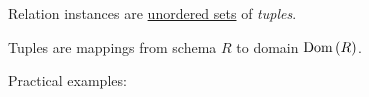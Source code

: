 \begin{multicols}{2}
\begin{CheatsheetEntryFrame}
    \end{CheatsheetEntryFrame}



    \begin{CheatsheetEntryFrame}


        Relation instances are \ul{unordered sets} of \textit{tuples}.

        Tuples are mappings from schema $R$ to domain $\operatorname{Dom}{(R)}$.

        Practical examples:

        \begin{center}


\end{center}
\end{CheatsheetEntryFrame}
\end{multicols}
